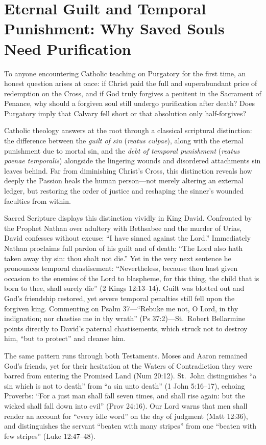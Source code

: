 \section{Eternal Guilt and Temporal Punishment: Why Saved Souls Need Purification}

To anyone encountering Catholic teaching on Purgatory for the first time, an honest question arises at once: if Christ paid the full and superabundant price of redemption on the Cross, and if God truly forgives a penitent in the Sacrament of Penance, why should a forgiven soul still undergo purification after death? Does Purgatory imply that Calvary fell short or that absolution only half-forgives?

Catholic theology answers at the root through a classical scriptural distinction: the difference between the \textit{guilt of sin} (\textit{reatus culpae}), along with the eternal punishment due to mortal sin, and the \textit{debt of temporal punishment} (\textit{reatus poenae temporalis}) alongside the lingering wounds and disordered attachments sin leaves behind. Far from diminishing Christ's Cross, this distinction reveals how deeply the Passion heals the human person---not merely altering an external ledger, but restoring the order of justice and reshaping the sinner's wounded faculties from within.

Sacred Scripture displays this distinction vividly in King David. Confronted by the Prophet Nathan over adultery with Bethsabee and the murder of Urias, David confesses without excuse: ``I have sinned against the Lord.'' Immediately Nathan proclaims full pardon of his guilt and of death: ``The Lord also hath taken away thy sin: thou shalt not die.'' Yet in the very next sentence he pronounces temporal chastisement: ``Nevertheless, because thou hast given occasion to the enemies of the Lord to blaspheme, for this thing, the child that is born to thee, shall surely die'' (2 Kings 12:13--14). Guilt was blotted out and God's friendship restored, yet severe temporal penalties still fell upon the forgiven king. Commenting on Psalm 37---``Rebuke me not, O Lord, in thy indignation; nor chastise me in thy wrath'' (Ps 37:2)---St.\ Robert Bellarmine points directly to David's paternal chastisements, which struck not to destroy him, ``but to protect'' and cleanse him.

The same pattern runs through both Testaments. Moses and Aaron remained God's friends, yet for their hesitation at the Waters of Contradiction they were barred from entering the Promised Land (Num 20:12). St.\ John distinguishes ``a sin which is not to death'' from ``a sin unto death'' (1 John 5:16--17), echoing Proverbs: ``For a just man shall fall seven times, and shall rise again: but the wicked shall fall down into evil'' (Prov 24:16). Our Lord warns that men shall render an account for ``every idle word'' on the day of judgment (Matt 12:36), and distinguishes the servant ``beaten with many stripes'' from one ``beaten with few stripes'' (Luke 12:47--48).

